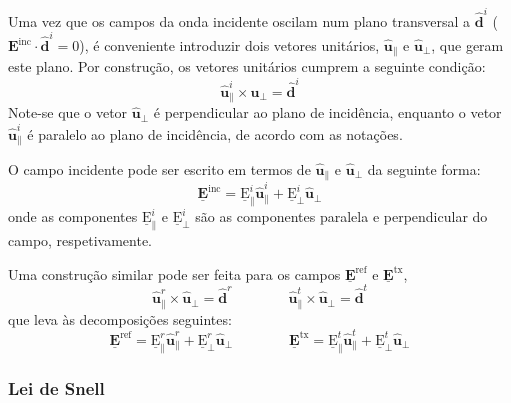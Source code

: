 \vspace{-1em}
Uma vez que os campos da onda incidente oscilam num plano transversal a $\mathbf{\hat{d}}^i$ ($\mathbf{E}^{\text{inc}} \cdot \mathbf{\hat{d}}^i = 0$), é conveniente introduzir dois vetores unitários, $\mathbf{\hat{u}}_{\parallel}$ e $\mathbf{\hat{u}}_{\perp}$, que geram este plano. Por construção, os vetores unitários cumprem a seguinte condição:
\begin{equation}
    \mathbf{\hat{u}}^{i}_{\parallel} \times \mathbf{\hat{u}}_{\perp} = \mathbf{\hat{d}}^i
\end{equation}
Note-se que o vetor $\mathbf{\hat{u}}_{\perp}$ é perpendicular ao plano de incidência, enquanto o vetor $\mathbf{\hat{u}}^{i}_{\parallel}$ é paralelo ao plano de incidência, de acordo com as notações. 

O campo incidente pode ser escrito em termos de $\mathbf{\hat{u}}_{\parallel}$ e $\mathbf{\hat{u}}_{\perp}$ da seguinte forma:
\begin{equation}
    \mathbf{\underline{E}}^{\text{inc}} = \underline{\mathrm{E}}^{i}_{\parallel} \mathbf{\hat{u}}^{i}_{\parallel} + \underline{\mathrm{E}}^{i}_{\perp} \mathbf{\hat{u}}_{\perp}
\end{equation}
onde as componentes $\underline{\mathrm{E}}^{i}_{\parallel}$ e $\underline{\mathrm{E}}^{i}_{\perp}$ são as componentes paralela e perpendicular do campo, respetivamente.

Uma construção similar pode ser feita para os campos $\mathbf{\underline{E}}^{\text{ref}}$ e $\mathbf{\underline{E}}^{\text{tx}}$,
\begin{equation}
    \mathbf{\hat{u}}^{r}_{\parallel} \times \mathbf{\hat{u}}_{\perp} = \mathbf{\hat{d}}^r
    \qquad\qquad
    \mathbf{\hat{u}}^{t}_{\parallel} \times \mathbf{\hat{u}}_{\perp} = \mathbf{\hat{d}}^t
\end{equation}
que leva às decomposições seguintes:
\begin{equation}
    \mathbf{\underline{E}}^{\text{ref}} = \underline{\mathrm{E}}^{r}_{\parallel} \mathbf{\hat{u}}^{r}_{\parallel} + \underline{\mathrm{E}}^{r}_{\perp} \mathbf{\hat{u}}_{\perp}
    \qquad\qquad
    \mathbf{\underline{E}}^{\text{tx}} = \underline{\mathrm{E}}^{t}_{\parallel} \mathbf{\hat{u}}^{t}_{\parallel} + \underline{\mathrm{E}}^{t}_{\perp} \mathbf{\hat{u}}_{\perp}
\end{equation}

\subsubsection{Lei de Snell}
\label{subsubsec:lei-de-snell}

